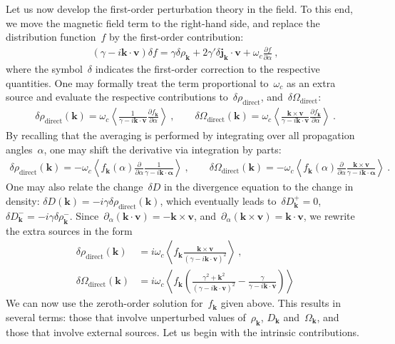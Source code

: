 \documentclass[preprint,aps,eqsecnum]{revtex4-1}
\newcommand{\fplus}[1]{{#1}^{+}}
\newcommand{\fminus}[1]{{#1}^{-}}
\newcommand{\dct}[1]{{#1}_\mathrm{direct}}
\begin{document}
Let us now develop the first-order perturbation theory in the field.
To this end, we move the magnetic field term to the right-hand
side, and replace the distribution function~$f$ by the first-order
contribution:
\begin{align}
  (\gamma - i {\bm k} \cdot {\bm v})\delta f =
  \gamma \delta \rho_{\bm k} + 2 \gamma' \delta{\bm j}_{\bm k}
  \cdot {\bm v} + \omega_c \frac{\partial f}{\partial \alpha}\ ,
\end{align}
where the symbol~$\delta$ indicates the first-order correction
to the respective quantities. One may formally treat the
term proportional to~$\omega_c$ as an extra source and evaluate
the respective contributions to~$\delta \rho_\mathrm{direct}$,
and~$\delta \Omega_\mathrm{direct}$:
\begin{align}
  \delta \rho_\mathrm{direct}({\bm k})
  = \omega_c \left\langle \frac{1}{\gamma  - i {\bm k}\cdot{\bm v}}
     \frac{\partial f_{\bm k}}{\partial\alpha}
  \right\rangle
  \ ,
  \qquad
  \delta \Omega_\mathrm{direct}({\bm k})
  = \omega_c \left\langle \frac{{\bm k}\times{\bm v}}{
          \gamma  - i {\bm k}\cdot{\bm v}}
     \frac{\partial f_{\bm k}}{\partial\alpha}
  \right\rangle  \ .
\end{align}
By recalling that the averaging is performed by integrating over
all propagation angles~$\alpha$, one may shift the derivative
via integration by parts:
\begin{align}
  \delta \rho_\mathrm{direct}({\bm k})
  = - \omega_c \left\langle f_{\bm k}(\alpha)
  \frac{\partial}{\partial\alpha} \frac{1}{\gamma
      - i {\bm k}\cdot{\bm \alpha}}
  \right\rangle\ ,
  \qquad
  \delta \Omega_\mathrm{direct}({\bm k})
  = - \omega_c \left\langle f_{\bm k}(\alpha)
  \frac{\partial}{\partial\alpha} \frac{{\bm k}\times{\bm v}}{\gamma
      - i {\bm k}\cdot{\bm \alpha}}
  \right\rangle\ .
\end{align}
One may also relate the change~$\delta D$ in the
divergence equation to the change in density:
$\delta D({\bm k}) = - i \gamma \delta\dct{\rho}({\bm k})$,
which eventually leads to~$\delta \fplus{D}_{\bm k} = 0$,
$\delta\fminus{D}_{\bm k} = -i \gamma \delta\fminus{\rho}_{\bm k}$.
Since~$\partial_\alpha({\bm k}\cdot{\bm v}) = - {\bm k}\times{\bm v}$,
and~$\partial_\alpha({\bm k}\times{\bm v}) =  {\bm k}\cdot{\bm v}$,
we rewrite the extra sources in the form
\begin{align}
  \delta \rho_\mathrm{direct}({\bm k}) &= i \omega_c
  \left\langle f_{\bm k} \frac{{\bm k}\times{\bm v}}{
  (\gamma  - i {\bm k}\cdot{\bm v})^2} \right\rangle \ ,
  \\
  \delta \Omega_\mathrm{direct}({\bm k})
  &= i \omega_c \left\langle f_{\bm k} \left(
  \frac{\gamma^2 + {\bm k}^2}{(\gamma - i {\bm k}\cdot{\bm v})^2}
  - \frac{\gamma}{\gamma - i {\bm k} \cdot{\bm v}}
  \right)\right\rangle
\end{align}
We can now use the zeroth-order solution for~$f_{\bm k}$ given above.
This results in several terms: those that involve unperturbed
values of~$\rho_{\bm k}$, $D_{\bm k}$ and~$\Omega_{\bm k}$,
and those that involve external sources. Let us begin with the
intrinsic contributions.
\end{document}
